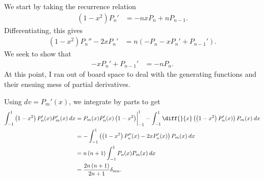 \documentclass[10pt]{mypackage}
\begin{document}
\RaggedRight
\begin{solution}[32.20]
  We start by taking the recurrence relation
  \begin{align*}
    \left( 1-x^2 \right)P_n' &= -nxP_n + nP_{n-1}.\label{eq:derivative_recursion}\tag{$\ast$}
  \end{align*}
  Differentiating, this gives
  \begin{align*}
    \left( 1-x^2 \right)P_n'' - 2xP_n' &= n\left( -P_n - xP_n' + P_{n-1}' \right). 
  \end{align*}
  We seek to show that
  \begin{align*}
    -xP_n' + P_{n-1}' &= -nP_n.
  \end{align*}
  At this point, I ran out of board space to deal with the generating functions and their ensuing mess of partial derivatives.
\end{solution}
\begin{solution}[32.21]
  Using $dv=P_m'(x)$, we integrate by parts to get
  \begin{align*}
    \int_{-1}^{1} \left( 1-x^2 \right)P_n'(x)P_m'(x)\:dx &= P_m(x)P_n'(x)\left( 1-x^2 \right)\biggr\vert_{-1}^{1} - \int_{-1}^{1} \diff{}{x}\left( \left( 1-x^2 \right)P_n'(x) \right)P_m(x)\:dx\\
                                                         &= - \int_{-1}^{1} \left( \left( 1-x^2 \right)P_n''(x) - 2xP_n'(x) \right)P_{m}(x)\:dx\\
                                                         &= n\left( n+1 \right) \int_{-1}^{1} P_n(x)P_m(x)\:dx\\
                                                         &= \frac{2n\left( n+1 \right)}{2n+1} \delta_{mn}.
  \end{align*}
\end{solution}
\end{document}
